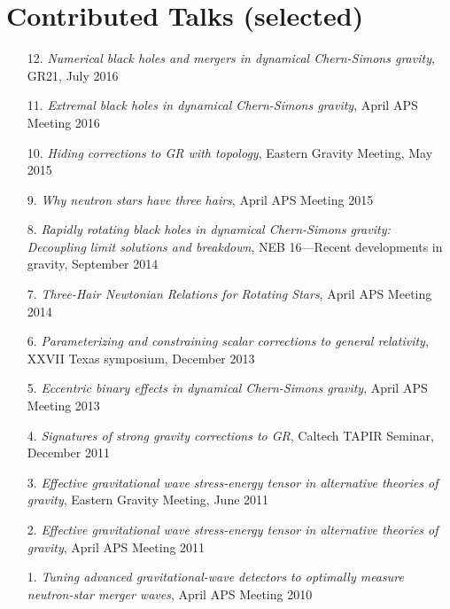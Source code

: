 \section{\sc Contributed Talks (selected)}
\begin{enumerate}
\item[{12.}] {\it Numerical black holes and mergers in dynamical
    Chern-Simons gravity},
  GR21, July 2016
\item[{11.}] {\it Extremal black holes in dynamical Chern-Simons gravity},
 April APS Meeting 2016
\item[{10.}] {\it Hiding corrections to GR with topology},
 Eastern Gravity Meeting, May 2015
\item[{9.}] {\it Why neutron stars have three hairs},
 April APS Meeting 2015
\item[{8.}] {\it Rapidly rotating black holes in dynamical Chern-Simons gravity:
    Decoupling limit solutions and breakdown},
 NEB 16---Recent developments in gravity, September 2014
\item[{7.}] {\it Three-Hair Newtonian Relations for Rotating Stars},
 April APS Meeting 2014
\item[{6.}] {\it Parameterizing and constraining scalar corrections to general relativity},
 XXVII Texas symposium, December 2013
\item[{5.}] {\it Eccentric binary effects in dynamical Chern-Simons gravity},
  April APS Meeting 2013
\item[{4.}] {\it Signatures of strong gravity corrections to GR},
  Caltech TAPIR Seminar, December 2011
\item[{3.}] {\it Effective gravitational wave stress-energy tensor in
    alternative theories of gravity}, Eastern Gravity Meeting, June 2011
\item[{2.}] {\it Effective gravitational wave stress-energy tensor in alternative theories of gravity}, April APS Meeting 2011
\item[{1.}] {\it Tuning advanced gravitational-wave detectors to
    optimally measure neutron-star merger waves}, April APS Meeting 2010
\end{enumerate}


